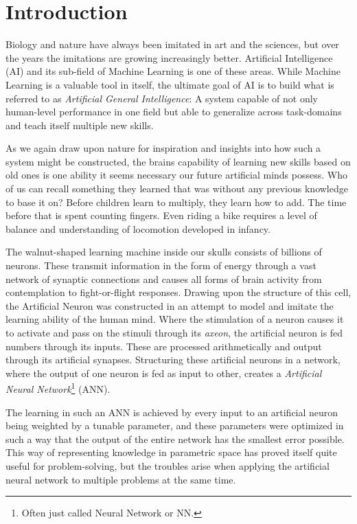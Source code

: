 \chapter{Introduction}

Biology and nature have always been imitated in art and the sciences, but over the years the imitations are growing increasingly better. Artificial Intelligence (AI) and its sub-field of Machine Learning is one of these areas. While Machine Learning is a valuable tool in itself, the ultimate goal of AI is to build what is referred to as \textit{Artificial General Intelligence}: A system capable of not only human-level performance in one field but able to generalize across task-domains and teach itself multiple new skills. 

As we again draw upon nature for inspiration and insights into how such a system might be constructed, the brains capability of learning new skills based on old ones is one ability it seems necessary our future artificial minds possess. Who of us can recall something they learned that was without any previous knowledge to base it on? Before children learn to multiply, they learn how to add. The time before that is spent counting fingers. Even riding a bike requires a level of balance and understanding of locomotion developed in infancy.

The walnut-shaped learning machine inside our skulls consists of billions of neurons. These transmit information in the form of energy through a vast network of synaptic connections and causes all forms of brain activity from contemplation to fight-or-flight responses. Drawing upon the structure of this cell, the Artificial Neuron was constructed in an attempt to model and imitate the learning ability of the human mind. Where the stimulation of a neuron causes it to activate and pass on the stimuli through its \textit{axeon}, the artificial neuron is fed numbers through its inputs. These are processed arithmetically and output through its artificial synapses. Structuring these artificial neurons in a network, where the output of one neuron is fed as input to other, creates a \textit{Artificial Neural Network}\footnote{Often just called Neural Network or NN.} (ANN). 

The learning in such an ANN is achieved by every input to an artificial neuron being weighted by a tunable parameter, and these parameters were optimized in such a way that the output of the entire network has the smallest error possible. This way of representing knowledge in parametric space has proved itself quite useful for problem-solving, but the troubles arise when applying the artificial neural network to multiple problems at the same time.

